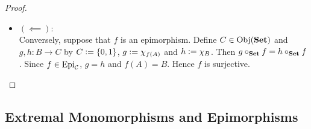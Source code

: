 \documentclass{book}
\begin{document}
\begin{proof}
\begin{enumerate}
\begin{itemize}
\begin{align*}
					& = h \circ_{\bSet} f (x) \\
					& = h(f(x)) \\
					& = h(y) 
				\end{align*}
				Since $y \in B$ is arbitrary, we have that for each $y \in B$, $g(y) = h(y)$. Hence $g = h$. Since $C \in \Obj(\MC)$ and $g,h \in \Hom_{\bSet}(B, C)$ with $g \circ_{\bSet} f = h \circ_{\bSet} f$ are arbitrary, we have that for each $C \in \Obj(\MC)$ and $g,h \in \Hom_{\bSet}(B, C)$, $g \circ_{\bSet} f = h \circ_{\bSet} f$ implies that $g = h$. Hence $f$ is an epimorphism. \\
				\item $(\impliedby)$: \\
				Conversely, suppose that $f$ is an epimorphism. Define $C \in \operatorname{Obj}(\text{\textbf{Set}})$ and $g, h: B \rightarrow C$ by $C \vcentcolon= \{0,1\}$, $g \vcentcolon= \chi_{f(A)}$ and $h \vcentcolon= \chi_{B}$. Then $g \circ_{\bSet} f = h \circ_{\bSet} f$. Since $f \in \operatorname{Epi}_{\mathcal{C}}$, $g = h$ and $f(A) = B$. Hence $f$ is surjective. 
			\end{itemize} 
		\end{enumerate}
	\end{proof}
	
	
	
	
	
	
	
	
	
	
	
	
	
	
	
	
	
	
	
	
	
	
	
	
	
	
	
	
	
	
	
	
	
	
	
	
	
	
	
	
	
	
	
	
	
	
	\subsection{Extremal Monomorphisms and Epimorphisms}
	
\end{document}
